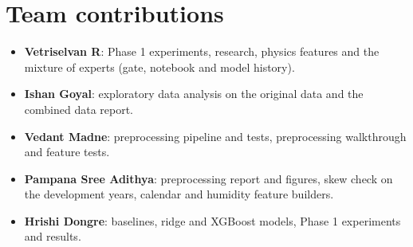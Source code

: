 \documentclass[conference]{IEEEtran}
\begin{document}
\section*{Team contributions}
\begin{itemize}
\item \textbf{Vetriselvan R}: Phase 1 experiments, research, physics features and the mixture of experts (gate, notebook and model history).
\item \textbf{Ishan Goyal}: exploratory data analysis on the original data and the combined data report.
\item \textbf{Vedant Madne}: preprocessing pipeline and tests, preprocessing walkthrough and feature tests.
\item \textbf{Pampana Sree Adithya}: preprocessing report and figures, skew check on the development years, calendar and humidity feature builders.
\item \textbf{Hrishi Dongre}: baselines, ridge and XGBoost models, Phase 1 experiments and results.
\end{itemize}
\end{document}

